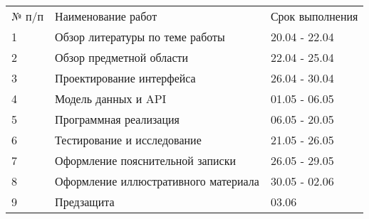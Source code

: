 
\begin{center}

	\vspace*{1.5cm}

	\confirmation

	\vspace*{1.5cm}
	
	\worktitle

	\vspace*{0.5cm}
	
	\begin{tabularx}{\textwidth}{ l X l }
		№ п/п & Наименование работ & Срок выполнения \\
		1 & Обзор литературы по теме работы & 20.04 - 22.04 \\
		2 & Обзор предметной области & 22.04 - 25.04 \\
		3 & Проектирование интерфейса & 26.04 - 30.04 \\
		4 & Модель данных и API & 01.05 - 06.05 \\
		5 & Программная реализация & 06.05 - 20.05 \\
		6 & Тестирование и исследование & 21.05 - 26.05 \\
		7 & Оформление пояснительной записки & 26.05 - 29.05 \\
		8 & Оформление иллюстративного материала & 30.05 - 02.06 \\
		9 & Предзащита & 03.06
	\end{tabularx}

	\vspace*{2cm}

	\subsblock
\end{center}
